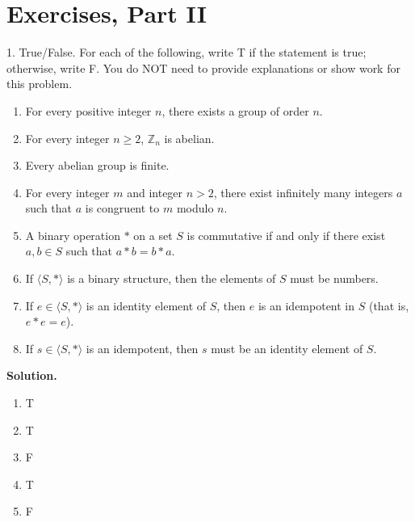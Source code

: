 \documentclass[10pt,]{book}
\theoremstyle{plain}
\theoremstyle{definition}
\theoremstyle{definition}
\theoremstyle{definition}
\theoremstyle{definition}
\numberwithin{equation}{section}
\def\Z{\mathbb{Z}}
\begin{document}
\section[{Exercises, Part II}]{Exercises, Part II}\label{exercises-3}
\begin{exerciselist}
\item[1.]\hypertarget{exercise-12}{}True/False. For each of the following, write T if the statement is true; otherwise, write F. You do NOT need to provide explanations or show work for this problem. \leavevmode%
\begin{enumerate}[label=(\alph*)]
\item\hypertarget{li-98}{}For every positive integer \(n\), there exists a group of order \(n\).%
\item\hypertarget{li-99}{}For every integer \(n\geq 2\), \(\Z_n\) is abelian.%
\item\hypertarget{li-100}{}Every abelian group is finite.%
\item\hypertarget{li-101}{}For every integer \(m\) and integer \(n>2\), there exist infinitely many integers \(a\) such that \(a\) is congruent to \(m\) modulo \(n\).%
\item\hypertarget{li-102}{}A binary operation \(*\) on a set \(S\) is commutative if and only if there exist \(a,b\in S\) such that \(a*b=b*a\).%
\item\hypertarget{li-103}{}If \(\langle S, *\rangle\) is a binary structure, then the elements of \(S\) must be numbers.%
\item\hypertarget{li-104}{}If \(e\in \langle S,*\rangle\) is an identity element of \(S\), then \(e\) is an idempotent in \(S\) (that is, \(e*e=e\)).%
\item\hypertarget{li-105}{}If \(s\in \langle S,*\rangle\) is an idempotent, then \(s\) must be an identity element of \(S\).%
\end{enumerate}
%
\par\smallskip
\par\smallskip
\noindent\textbf{Solution.}\hypertarget{solution-12}{}\quad
\leavevmode%
\begin{multicols}{4}
\begin{enumerate}[label=(\alph*)]
\item\hypertarget{li-106}{}T%
\item\hypertarget{li-107}{}T%
\item\hypertarget{li-108}{}F%
\item\hypertarget{li-109}{}T%
\item\hypertarget{li-110}{}F%

\end{enumerate}
\end{multicols}
\end{exerciselist}
\end{document}
